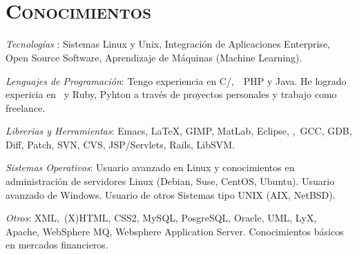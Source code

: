 \begin{resume}
 \begin{formatb}
   \\
   \body\\
 \end{formatb}



\section{\textsc{Conocimientos}}

\emph{Tecnolog\'{i}as }: Sistemas Linux y Unix, Integraci\'{o}n de
Aplicaciones Enterprise, Open Source Software, Aprendizaje de
M\'{a}quinas (Machine Learning).


\emph{Lenguajes de Programaci\'{o}n}: Tengo experiencia en
C/\Cplusplus,\ \ PHP y Java. He logrado expericia en
\ \CSharp y Ruby, Pyhton a trav\'{e}s de proyectos
personales y trabajo como freelance.

\emph{Librerias y Herramientas}: Emacs, \LaTeX, GIMP, MatLab, Eclipse, \GTKSharp,\ GCC, GDB, Diff, Patch, SVN, CVS, JSP/Servlets, Rails, LibSVM.

\emph{Sistemas Operativos}: Usuario avanzado en Linux  y conocimientos en
administraci\'{o}n de servidores Linux (Debian, Suse, CentOS, Ubuntu). Usuario avanzado de Windows. Usuario de
otros Sistemas tipo UNIX (AIX, NetBSD).

\emph{Otros}: XML,\ (X)HTML, CSS2, MySQL, PosgreSQL, Oracle,
UML, LyX, Apache, WebSphere MQ, Websphere Application
Server. Conocimientos b\'{a}sicos en mercados financieros.



\end{resume}
